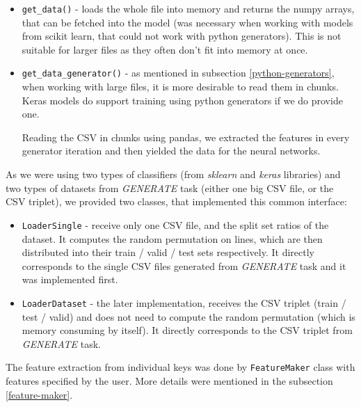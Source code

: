 \begin{itemize}

\item \texttt{get\_data()} - loads the whole file into memory and returns the numpy arrays, that can be fetched into the model (was necessary when working with models from scikit learn, that could not work with python generators). This is not suitable for larger files as they often don't fit into memory at once.

\item \texttt{get\_data\_generator()} - as mentioned in subsection \ref{python-generators}, when working with large files, it is more desirable to read them in chunks. Keras models do support training using python generators if we do provide one.

Reading the CSV in chunks using pandas, we extracted the features in every generator iteration and then yielded the data for the neural networks.

\end{itemize}

\noindent
As we were using two types of classifiers (from \textit{sklearn} and \textit{keras} libraries) and two types of datasets from \textit{GENERATE} task (either one big CSV file, or the CSV triplet), we provided two classes, that implemented this common interface:

\begin{itemize}

\item \texttt{LoaderSingle} - receive only one CSV file, and the split set ratios of the dataset. It computes the random permutation on lines, which are then distributed into their train / valid / test sets respectively. It directly corresponds to the single CSV files generated from \textit{GENERATE} task and it was implemented first.

\item \texttt{LoaderDataset} - the later implementation, receives the CSV triplet (train / test / valid) and does not need to compute the random permutation (which is memory consuming by itself). It directly corresponds to the CSV triplet from \textit{GENERATE} task.

\end{itemize}

\noindent
The feature extraction from individual keys was done by \texttt{FeatureMaker} class with features specified by the user. More details were mentioned in the subsection \ref{feature-maker}.

